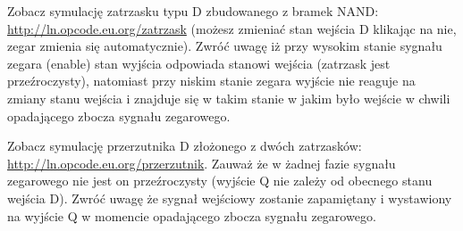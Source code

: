 \documentclass{pdfBooklets}
\begin{document}
Zobacz symulację zatrzasku typu D zbudowanego z bramek NAND: \url{http://ln.opcode.eu.org/zatrzask} (możesz zmieniać stan wejścia D klikając na nie, zegar zmienia się automatycznie).
Zwróć uwagę iż przy wysokim stanie sygnału zegara (enable) stan wyjścia odpowiada stanowi wejścia (zatrzask jest przeźroczysty),
	natomiast przy niskim stanie zegara wyjście nie reaguje na zmiany stanu wejścia i znajduje się w takim stanie w jakim było wejście w chwili opadającego zbocza sygnału zegarowego.

Zobacz symulację przerzutnika D złożonego z dwóch zatrzasków: \url{http://ln.opcode.eu.org/przerzutnik}.
Zauważ że w żadnej fazie sygnału zegarowego nie jest on przeźroczysty (wyjście Q nie zależy od obecnego stanu wejścia D).
Zwróć uwagę że sygnał wejściowy zostanie zapamiętany i wystawiony na wyjście Q w momencie opadającego zbocza sygnału zegarowego.
\end{document}
